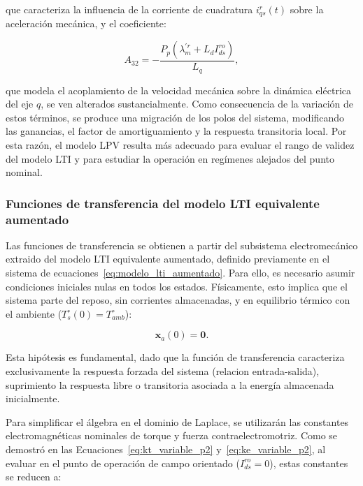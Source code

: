 \documentclass[10pt,a4paper]{article}
\begin{document}
que caracteriza la influencia de la corriente de cuadratura $i_{qs}^{r}(t)$ sobre la aceleración mecánica, y el coeficiente:

\begin{equation}
    A_{32}=-\frac{P_p\left(\lambda_m^{\prime r}+L_d I_{ds}^{ro}\right)}{L_q},
    \label{eq:A32_lpv}
\end{equation}

que modela el acoplamiento de la velocidad mecánica sobre la dinámica eléctrica del eje $q$,
se ven alterados sustancialmente. Como consecuencia de la variación de estos términos, 
se produce una migración de los polos del sistema, modificando las ganancias, el factor de amortiguamiento y la respuesta transitoria local. 
Por esta razón, el modelo LPV resulta más adecuado para evaluar el rango de validez del modelo LTI y para estudiar la operación en regímenes alejados del punto nominal.


\subsubsection{Funciones de transferencia del modelo LTI equivalente aumentado}

Las funciones de transferencia se obtienen a partir del subsistema electromecánico extraido del modelo LTI equivalente aumentado, 
definido previamente en el sistema de ecuaciones~\eqref{eq:modelo_lti_aumentado}.
Para ello, es necesario asumir condiciones iniciales nulas en todos los estados.
Físicamente, esto implica que el sistema parte del reposo, sin corrientes almacenadas, 
y en equilibrio térmico con el ambiente ($T_s^\circ(0) = T_{amb}^\circ$):

\begin{equation*}
    \mathbf{x}_a(0) = \mathbf{0}.
\end{equation*}

Esta hipótesis es fundamental, dado que la función de transferencia caracteriza exclusivamente la respuesta forzada del sistema (relacion entrada-salida), 
suprimiento la respuesta libre o transitoria asociada a la energía almacenada inicialmente. 

Para simplificar el álgebra en el dominio de Laplace, 
se utilizarán las constantes electromagnéticas nominales de torque y fuerza contraelectromotriz. 
Como se demostró en las Ecuaciones~\eqref{eq:kt_variable_p2} y~\eqref{eq:ke_variable_p2}, 
al evaluar en el punto de operación de campo orientado ($I_{ds}^{ro} = 0$), estas constantes se reducen a:
\end{document}
